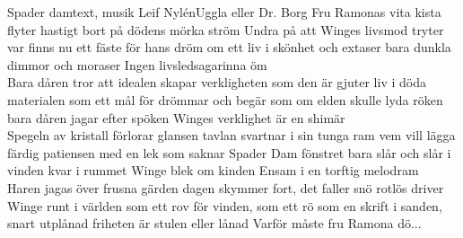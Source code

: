 \documentclass{musikal}[2025/10/20]
\begin{document}
\begin{song}{Spader dam}{text, musik Leif Nylén}{Uggla eller Dr. Borg}
    Fru Ramonas vita kista flyter 
    hastigt bort på dödens mörka ström
    Undra på att Winges livsmod tryter
    var finns nu ett fäste för hans dröm
    om ett liv i skönhet och extaser
    bara dunkla dimmor och moraser
    Ingen livsledsagarinna öm\\[1\baselineskip]

    Bara dåren tror att idealen
    skapar verkligheten som den är
    gjuter liv i döda materialen
    som ett mål för drömmar och begär
    som om elden skulle lyda röken
    bara dåren jagar efter spöken
    Winges verklighet är en shimär\\[1\baselineskip]
    
    Spegeln av kristall förlorar glansen
    tavlan svartnar i sin tunga ram
    vem vill lägga färdig patiensen
    med en lek som saknar Spader Dam
    fönstret bara slår och slår i vinden
    kvar i rummet Winge blek om kinden
    Ensam i en torftig melodram\\[1\baselineskip]
    
    Haren jagas över frusna gärden
    dagen skymmer fort, det faller snö
    rotlös driver Winge runt i världen
    som ett rov för vinden, som ett rö
    som en skrift i sanden, snart utplånad
    friheten är stulen eller lånad
    Varför måste fru Ramona dö...
\end{song}

\theend
\end{document}
